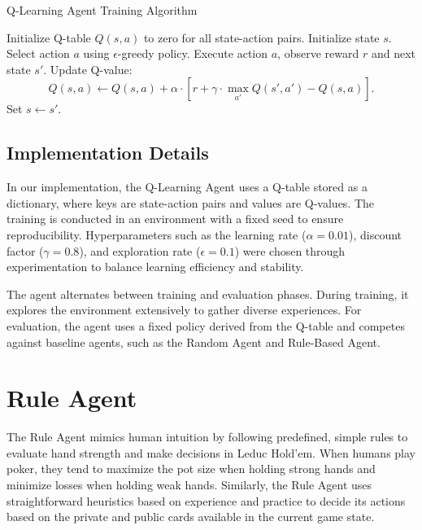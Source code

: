 \documentclass{article}
\begin{document}
\begin{algorithm}[H]
\caption{Q-Learning Agent Training Algorithm}
\begin{algorithmic}[1]
\STATE Initialize Q-table $Q(s, a)$ to zero for all state-action pairs.
    \STATE Initialize state $s$.
        \STATE Select action $a$ using $\epsilon$-greedy policy.
        \STATE Execute action $a$, observe reward $r$ and next state $s'$.
        \STATE Update Q-value:
        \[
        Q(s, a) \leftarrow Q(s, a) + \alpha \cdot \left[ r + \gamma \cdot \max_{a'} Q(s', a') - Q(s, a) \right].
        \]
        \STATE Set $s \leftarrow s'$.
    \ENDWHILE
\ENDFOR
\end{algorithmic}
\end{algorithm}

\subsection{Implementation Details}

In our implementation, the Q-Learning Agent uses a Q-table stored as a dictionary, where keys are state-action pairs and values are Q-values. The training is conducted in an environment with a fixed seed to ensure reproducibility. Hyperparameters such as the learning rate ($\alpha = 0.01$), discount factor ($\gamma = 0.8$), and exploration rate ($\epsilon = 0.1$) were chosen through experimentation to balance learning efficiency and stability.

The agent alternates between training and evaluation phases. During training, it explores the environment extensively to gather diverse experiences. For evaluation, the agent uses a fixed policy derived from the Q-table and competes against baseline agents, such as the Random Agent and Rule-Based Agent. 

\section{Rule Agent}

The Rule Agent mimics human intuition by following predefined, simple rules to evaluate hand strength and make decisions in Leduc Hold’em. When humans play poker, they tend to maximize the pot size when holding strong hands and minimize losses when holding weak hands. Similarly, the Rule Agent uses straightforward heuristics based on experience and practice to decide its actions based on the private and public cards available in the current game state.
\end{document}
